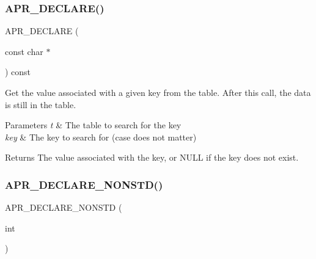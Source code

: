 \subsubsection{\texorpdfstring{A\+P\+R\+\_\+\+D\+E\+C\+L\+A\+R\+E()}{APR\_DECLARE()}\hspace{0.1cm}{\footnotesize\ttfamily [8/8]}}
{\footnotesize\ttfamily A\+P\+R\+\_\+\+D\+E\+C\+L\+A\+RE (\begin{DoxyParamCaption}\item[{const char $\ast$}]{ }\end{DoxyParamCaption}) const}

Get the value associated with a given key from the table. After this call, the data is still in the table. 
\begin{DoxyParams}{Parameters}
{\em t} & The table to search for the key \\
\hline
{\em key} & The key to search for (case does not matter) \\
\hline
\end{DoxyParams}
\begin{DoxyReturn}{Returns}
The value associated with the key, or N\+U\+LL if the key does not exist. 
\end{DoxyReturn}
\mbox{\label{group__apr__tables_gab02b0393c878208ff6cb55c701ff536a}} 
\subsubsection{\texorpdfstring{A\+P\+R\+\_\+\+D\+E\+C\+L\+A\+R\+E\+\_\+\+N\+O\+N\+S\+T\+D()}{APR\_DECLARE\_NONSTD()}}
{\footnotesize\ttfamily A\+P\+R\+\_\+\+D\+E\+C\+L\+A\+R\+E\+\_\+\+N\+O\+N\+S\+TD (\begin{DoxyParamCaption}\item[{int}]{ }\end{DoxyParamCaption})}

